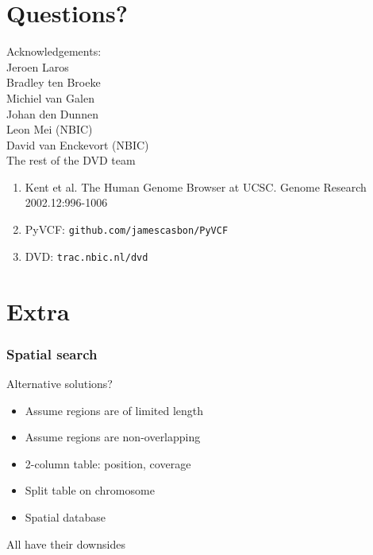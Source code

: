 \documentclass[slidestop]{beamer}
\begin{document}
\section{Questions?}
\lastpagetemplate
\begin{frame}
  \begin{center}
    Acknowledgements:\\
    \vspace{0.8cm}
    Jeroen Laros\\
    Bradley ten Broeke\\
    Michiel van Galen\\
    Johan den Dunnen\\
    \vspace{0.8cm}
    Leon Mei (NBIC)\\
    David van Enckevort (NBIC)\\
    The rest of the DVD team
  \end{center}
  \vspace{1cm}
  {\tiny
    \begin{enumerate}
      \item Kent et al. The Human Genome Browser at UCSC. Genome Research 2002.12:996-1006
      \item PyVCF: \texttt{github.com/jamescasbon/PyVCF}
      \item DVD: \texttt{trac.nbic.nl/dvd}
    \end{enumerate}
  }
\end{frame}

\section{Extra}

\begin{frame}
  \frametitle{Spatial search}
  Alternative solutions?
  \begin{itemize}[<+->]
    \item Assume regions are of limited length
    \item Assume regions are non-overlapping
    \item 2-column table: position, coverage
    \item Split table on chromosome
    \item Spatial database
  \end{itemize}
  \vspace{1cm}
  \pause
  All have their downsides
\end{frame}
\end{document}

